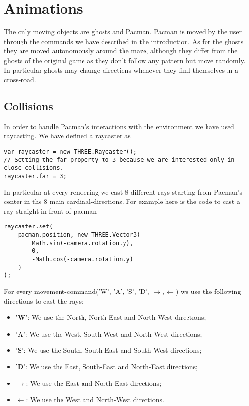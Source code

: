 \documentclass[a4paper,oneside]{report}
\begin{document}
\chapter{Animations}
The only moving objects are ghosts and Pacman. Pacman is moved by the user through the commands we have described in the introduction. As for the ghosts they are moved autonomously around the maze, although they differ from the ghosts of the original game as they don't follow any pattern but move randomly. In particular ghosts may change directions whenever they find themselves in a cross-road.
\section{Collisions}
In order to handle Pacman's interactions with the environment we have used raycasting. 
We have defined a raycaster as
\begin{lstlisting}
var raycaster = new THREE.Raycaster();
// Setting the far property to 3 because we are interested only in close collisions.
raycaster.far = 3;
\end{lstlisting}
In particular at every rendering we cast 8 different rays starting from Pacman's center in the 8 main cardinal-directions. For example here is the code to cast a ray straight in front of pacman
\begin{lstlisting}
raycaster.set(
	pacman.position, new THREE.Vector3(
		Math.sin(-camera.rotation.y),
		0,
		-Math.cos(-camera.rotation.y)
	)
);
\end{lstlisting}
For every movement-command('W', 'A', 'S', 'D', $\rightarrow , \leftarrow$) we use the following directions to cast the rays:
\begin{itemize}
\item '\textbf{W}': We use the North, North-East and North-West directions;
\item '\textbf{A}': We use the West, South-West and North-West directions;
\item '\textbf{S}': We use the South, South-East and South-West directions;
\item '\textbf{D}': We use the East, South-East and North-East directions;
\item $\rightarrow$: We use the East and North-East directions;
\item $\leftarrow$: We use the West and North-West directions.
\end{itemize}
\end{document}
